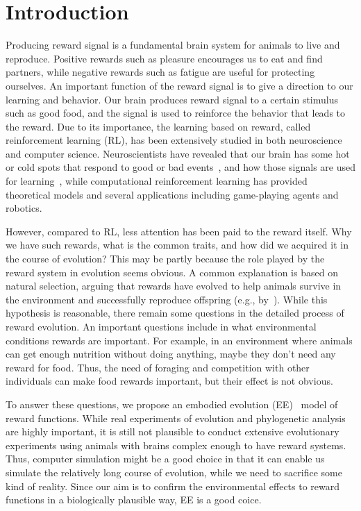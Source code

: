 \section{Introduction}

Producing reward signal is a fundamental brain system for animals to live and reproduce. Positive rewards such as pleasure encourages us to eat and find partners, while negative rewards such as fatigue are useful for protecting ourselves. An important function of the reward signal is to give a direction to our learning and behavior. Our brain produces reward signal to a certain stimulus such as good food, and the signal is used to reinforce the behavior that leads to the reward. Due to its importance, the learning based on reward, called reinforcement learning (RL), has been extensively studied in both neuroscience and computer science. Neuroscientists have revealed that our brain has some hot or cold spots that respond to good or bad events~\cite{berridgeAffectiveNeurosciencePleasure2008}, and how those signals are used for learning~\cite{schultzNeuronalRewardDecision2015}, while computational reinforcement learning has provided theoretical models and several applications including game-playing agents and robotics.

However, compared to RL, less attention has been paid to the reward itself. Why we have such rewards, what is the common traits, and how did we acquired it in the course of evolution? This may be partly because the role played by the reward system in evolution seems obvious. A common explanation is based on natural selection, arguing that rewards have evolved to help animals survive in the environment and successfully reproduce offspring (e.g., by~\cite{schultzNeuronalRewardDecision2015}). While this hypothesis is reasonable, there remain some questions in the detailed process of reward evolution. An important questions include in what environmental conditions rewards are important. For example, in an environment where animals can get enough nutrition without doing anything, maybe they don't need any reward for food. Thus, the need of foraging and competition with other individuals can make food rewards important, but their effect is not obvious. 

To answer these questions, we propose an embodied evolution (EE)~\cite{watsonEmbodiedEvolutionDistributing2002} model of reward functions. While real experiments of evolution and phylogenetic analysis are highly important, it is still not plausible to conduct extensive evolutionary experiments using animals with brains complex enough to have reward systems. Thus, computer simulation might be a good choice in that it can enable us simulate the relatively long course of evolution, while we need to sacrifice some kind of reality. Since our aim is to confirm the environmental effects to reward functions in a biologically plausible way, EE is a good coice.

